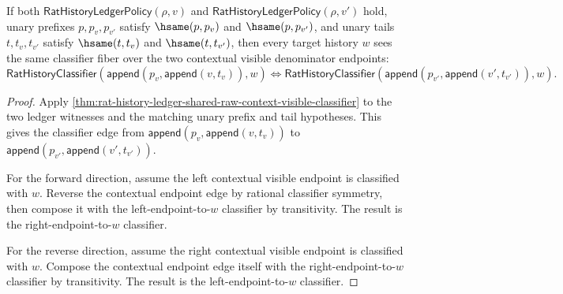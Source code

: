 \begin{theorem}
\label{thm:rat-history-ledger-shared-raw-context-visible-endpoint-equivalence}
If both $\mathsf{RatHistoryLedgerPolicy}(\rho,v)$ and
$\mathsf{RatHistoryLedgerPolicy}(\rho,v')$ hold, unary prefixes $p,p_v,p_{v'}$
satisfy $\hsame(p,p_v)$ and $\hsame(p,p_{v'})$, and unary tails
$t,t_v,t_{v'}$ satisfy $\hsame(t,t_v)$ and $\hsame(t,t_{v'})$, then every
target history $w$ sees the same classifier fiber over the two contextual
visible denominator endpoints:
$$
\mathsf{RatHistoryClassifier}(\mathsf{append}(p_v,\mathsf{append}(v,t_v)),w)
\Longleftrightarrow
\mathsf{RatHistoryClassifier}(\mathsf{append}(p_{v'},\mathsf{append}(v',t_{v'})),w).
$$
\end{theorem}
\begin{proof}
Apply
\autoref{thm:rat-history-ledger-shared-raw-context-visible-classifier} to the
two ledger witnesses and the matching unary prefix and tail hypotheses. This
gives the classifier edge from
$\mathsf{append}(p_v,\mathsf{append}(v,t_v))$ to
$\mathsf{append}(p_{v'},\mathsf{append}(v',t_{v'}))$.

For the forward direction, assume the left contextual visible endpoint is
classified with $w$. Reverse the contextual endpoint edge by rational classifier
symmetry, then compose it with the left-endpoint-to-$w$ classifier by
transitivity. The result is the right-endpoint-to-$w$ classifier.

For the reverse direction, assume the right contextual visible endpoint is
classified with $w$. Compose the contextual endpoint edge itself with the
right-endpoint-to-$w$ classifier by transitivity. The result is the
left-endpoint-to-$w$ classifier.
\end{proof}

